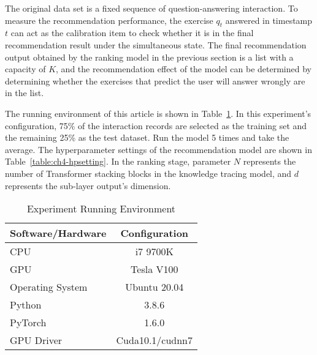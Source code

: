The original data set is a fixed sequence of question-answering interaction. To measure the recommendation performance, the exercise \(q_t\) answered in timestamp \(t\) can act as the calibration item to check whether it is in the final recommendation result under the simultaneous state. The final recommendation output obtained by the ranking model in the previous section is a list with a capacity of \(K\), and the recommendation effect of the model can be determined by determining whether the exercises that predict the user will answer wrongly are in the list.


The running environment of this article is shown in Table~\ref{table:ch4-exp-env}. In this experiment's configuration, 75\% of the interaction records are selected as the training set and the remaining 25\% as the test dataset. Run the model 5 times and take the average. The hyperparameter settings of the recommendation model are shown in Table~\ref{table:ch4-hpsetting}. In the ranking stage, parameter \(N\) represents the number of Transformer stacking blocks in the knowledge tracing model, and \(d\) represents the sub-layer output's dimension.

\begin{table}[htbp!]
  \caption{Experiment Running Environment}\label{table:ch4-exp-env}
  \centering
  \begin{tabular}{l c}
    \toprule
    Software/Hardware & Configuration   \\
    \midrule
    CPU               & i7 9700K        \\

    GPU               & Tesla V100      \\

    Operating System  & Ubuntu 20.04    \\

    Python            & 3.8.6           \\

    PyTorch           & 1.6.0           \\

    GPU Driver        & Cuda10.1/cudnn7 \\
    \bottomrule
  \end{tabular}
\end{table}

